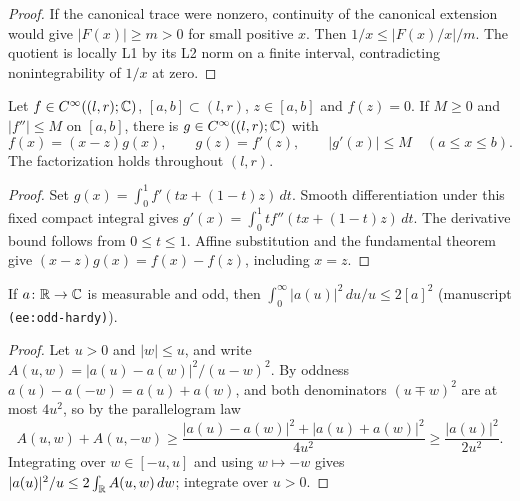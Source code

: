 \begin{proof}
\leanok
If the canonical trace were nonzero, continuity of the canonical
extension would give $|F(x)|\ge m>0$ for small positive $x$.
Then $1/x\le |F(x)/x|/m$.
The quotient is locally L1 by its L2 norm on a finite interval,
contradicting nonintegrability of $1/x$ at zero.
\end{proof}

\begin{lemma}
\label{lem:smooth-linear-factor}
\leanok
Let $f\in C^\infty((l,r);\mathbb{C})$, $[a,b]\subset(l,r)$,
$z\in[a,b]$ and $f(z)=0$. If $M\ge0$ and $|f''|\le M$ on $[a,b]$,
there is $g\in C^\infty((l,r);\mathbb{C})$ with
\[
 f(x)=(x-z)g(x),\qquad g(z)=f'(z),\qquad
 |g'(x)|\le M\quad(a\le x\le b).
\]
The factorization holds throughout $(l,r)$.
\end{lemma}

\begin{proof}
\leanok
Set $g(x)=\int_0^1 f'(tx+(1-t)z)\,dt$.
Smooth differentiation under this fixed compact integral gives
$g'(x)=\int_0^1 t f''(tx+(1-t)z)\,dt$.
The derivative bound follows from $0\le t\le1$.
Affine substitution and the fundamental theorem give
$(x-z)g(x)=f(x)-f(z)$, including $x=z$.
\end{proof}

\begin{lemma}
\label{lem:odd-hardy}
\leanok
If $a\colon\mathbb{R}\to\mathbb{C}$ is measurable and odd, then
$\int_0^\infty|a(u)|^2\,du/u\le2[a]^2$ (manuscript \texttt{(ee:odd-hardy)}).
\end{lemma}

\begin{proof}
\leanok
Let $u>0$ and $|w|\le u$, and write $A(u,w)=|a(u)-a(w)|^2/(u-w)^2$. By oddness
$a(u)-a(-w)=a(u)+a(w)$, and both denominators $(u\mp w)^2$ are at most $4u^2$, so by the
parallelogram law
\[
  A(u,w)+A(u,-w)\ge\frac{|a(u)-a(w)|^2+|a(u)+a(w)|^2}{4u^2}\ge\frac{|a(u)|^2}{2u^2}.
\]
Integrating over $w\in[-u,u]$ and using $w\mapsto-w$ gives
$|a(u)|^2/u\le2\int_{\mathbb{R}} A(u,w)\,dw$; integrate over $u>0$.
\end{proof}

